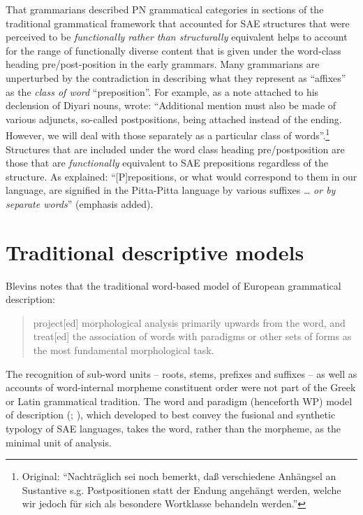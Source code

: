 That grammarians described PN grammatical categories in sections of the traditional grammatical framework that accounted for SAE structures that were perceived to be \textit{functionally rather than structurally} equivalent helps to account for the range of functionally diverse content that is given under the word-class heading pre/post-position in the early grammars. Many grammarians are unperturbed by the contradiction in describing what they represent as “affixes” as the \textit{class of word} “preposition''. For example, as a note attached to his declension of Diyari nouns, \citet[no pag.]{koch_untitled_1868} wrote: “Additional mention must also be made of various adjuncts, so-called postpositions, being attached instead of the ending. However, we will deal with those separately as a particular class of words”.\footnote{Original: ``Nachträglich sei noch bemerkt, daß verschiedene Anhängsel an Sustantive s.g. Postpositionen statt der Endung angehängt werden, welche wir jedoch für sich als besondere Wortklasse behandeln werden.''}  Structures that are included under the word class heading pre/postposition are those that are \textit{functionally} equivalent to SAE prepositions regardless of the structure. As \citet[13]{roth_ethnological_1897} explained: “[P]repositions, or what would correspond to them in our language, are signified in the Pitta-Pitta language by various suffixes … \textit{or by separate words}'' (emphasis added).

\section{Traditional descriptive models}
\label{sec:key:2.4}

Blevins notes that the traditional word-based model of European grammatical description:

\begin{quote}
    project[ed] morphological analysis primarily upwards from the word, and treat[ed] the association of words with paradigms or other sets of forms as the most fundamental morphological task. \citep[375]{blevins_word-based_2013}
\end{quote}

The recognition of sub-word units – roots, stems, prefixes and suffixes – as well as accounts of word-internal morpheme constituent order were not part of the Greek or Latin grammatical tradition. The word and paradigm (henceforth WP) model of description (\citealt{hockett_two_1954}; \citealt{Robins_1959}), which developed to best convey the fusional and synthetic typology of SAE languages, takes the word, rather than the morpheme, as the minimal unit of analysis.

